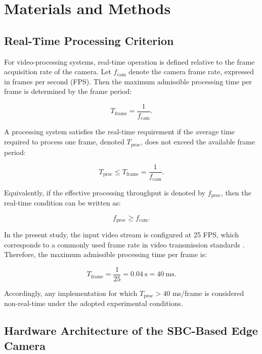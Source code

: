 \documentclass[
]{ceurart}
\begin{document}
\section{Materials and Methods}

\subsection{Real-Time Processing Criterion}
\label{subsec:subsec_3_1}

For video-processing systems, real-time operation is defined relative to the frame acquisition rate of the camera. Let $f_{\mathrm{cam}}$ denote the camera frame rate, expressed in frames per second (FPS). Then the maximum admissible processing time per frame is determined by the frame period:

\begin{equation}
	T_{\mathrm{frame}}=\frac{1}{f_{\mathrm{cam}}}.
\end{equation}

A processing system satisfies the real-time requirement if the average time required to process one frame, denoted $T_{\mathrm{proc}}$, does not exceed the available frame period:

\begin{equation}
	T_{\mathrm{proc}} \leq T_{\mathrm{frame}}=\frac{1}{f_{\mathrm{cam}}}.
\end{equation}

Equivalently, if the effective processing throughput is denoted by $f_{\mathrm{proc}}$, then the real-time condition can be written as:

\begin{equation}
	f_{\mathrm{proc}} \geq f_{\mathrm{cam}}.
\end{equation}

In the present study, the input video stream is configured at 25 FPS, which corresponds to a commonly used frame rate in video transmission standards \cite{itu_bt1197_1_1998}. Therefore, the maximum admissible processing time per frame is:

\begin{equation}
	T_{\mathrm{frame}}=\frac{1}{25}=0.04\ \mathrm{s}=40\ \mathrm{ms}.
\end{equation}

Accordingly, any implementation for which $T_{\mathrm{proc}}>40$ ms/frame is considered non-real-time under the adopted experimental conditions.

\subsection{Hardware Architecture of the SBC-Based Edge Camera}
\end{document}
